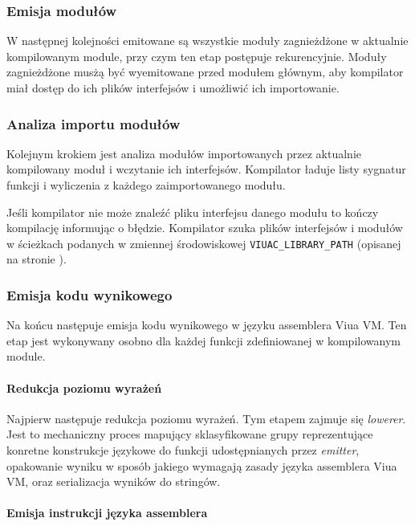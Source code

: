 \subsubsection{Emisja modułów}

W następnej kolejności emitowane są wszystkie moduły zagnieżdżone w aktualnie kompilowanym module, przy czym
ten etap postępuje rekurencyjnie. Moduły zagnieżdżone musżą być wyemitowane przed modułem głównym, aby
kompilator miał dostęp do ich plików interfejsów i umożliwić ich importowanie.

\subsubsection{Analiza importu modułów}

Kolejnym krokiem jest analiza modułów importowanych przez aktualnie kompilowany moduł i wczytanie ich
interfejsów. Kompilator ładuje listy sygnatur funkcji i wyliczenia z każdego zaimportowanego modułu.

Jeśli kompilator nie może znaleźć pliku interfejsu danego modułu to kończy kompilację informując o błędzie.
Kompilator szuka plików interfejsów i modułów w ścieżkach podanych w zmiennej środowiskowej
\texttt{VIUAC\_LIBRARY\_PATH} (opisanej na stronie \pageref{viuact_manual_env_viuac_library_path}).

\subsubsection{Emisja kodu wynikowego}
\label{opis_etapow_kompilacji_emisja_kodu_wynikowego}

Na końcu następuje emisja kodu wynikowego w języku assemblera Viua VM. Ten etap jest wykonywany osobno dla
każdej funkcji zdefiniowanej w kompilowanym module.

\paragraph{Redukcja poziomu wyrażeń}

Najpierw następuje redukcja poziomu wyrażeń. Tym etapem zajmuje się \emph{lowerer}. Jest to mechaniczny proces
mapujący sklasyfikowane grupy reprezentujące konretne konstrukcje językowe do funkcji udostępnianych przez
\emph{emitter}, opakowanie wyniku w sposób jakiego wymagają zasady języka assemblera Viua VM, oraz
serializacja wyników do stringów.

\paragraph{Emisja instrukcji języka assemblera}

